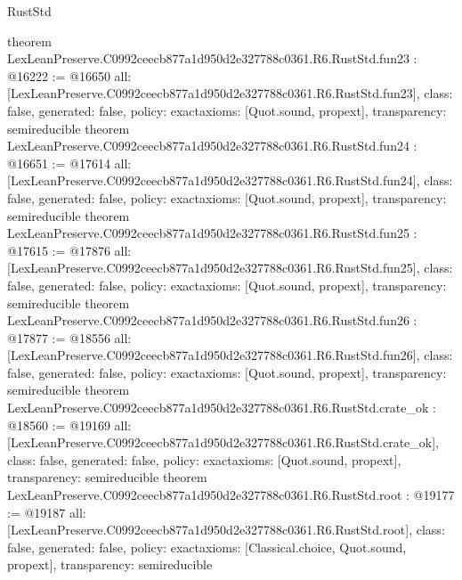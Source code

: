 \begin{lexlean}{RustStd}
\begin{coremodule}
{}
theorem LexLeanPreserve.C0992ceecb877a1d950d2e327788c0361.R6.RustStd.fun23 : @16222 := @16650 {
  all: [LexLeanPreserve.C0992ceecb877a1d950d2e327788c0361.R6.RustStd.fun23],
  class: false,
  generated: false,
  policy: exact{axioms: [Quot.sound, propext]},
  transparency: semireducible
}
theorem LexLeanPreserve.C0992ceecb877a1d950d2e327788c0361.R6.RustStd.fun24 : @16651 := @17614 {
  all: [LexLeanPreserve.C0992ceecb877a1d950d2e327788c0361.R6.RustStd.fun24],
  class: false,
  generated: false,
  policy: exact{axioms: [Quot.sound, propext]},
  transparency: semireducible
}
theorem LexLeanPreserve.C0992ceecb877a1d950d2e327788c0361.R6.RustStd.fun25 : @17615 := @17876 {
  all: [LexLeanPreserve.C0992ceecb877a1d950d2e327788c0361.R6.RustStd.fun25],
  class: false,
  generated: false,
  policy: exact{axioms: [Quot.sound, propext]},
  transparency: semireducible
}
theorem LexLeanPreserve.C0992ceecb877a1d950d2e327788c0361.R6.RustStd.fun26 : @17877 := @18556 {
  all: [LexLeanPreserve.C0992ceecb877a1d950d2e327788c0361.R6.RustStd.fun26],
  class: false,
  generated: false,
  policy: exact{axioms: [Quot.sound, propext]},
  transparency: semireducible
}
theorem LexLeanPreserve.C0992ceecb877a1d950d2e327788c0361.R6.RustStd.crate_ok : @18560 := @19169 {
  all: [LexLeanPreserve.C0992ceecb877a1d950d2e327788c0361.R6.RustStd.crate_ok],
  class: false,
  generated: false,
  policy: exact{axioms: [Quot.sound, propext]},
  transparency: semireducible
}
theorem LexLeanPreserve.C0992ceecb877a1d950d2e327788c0361.R6.RustStd.root : @19177 := @19187 {
  all: [LexLeanPreserve.C0992ceecb877a1d950d2e327788c0361.R6.RustStd.root],
  class: false,
  generated: false,
  policy: exact{axioms: [Classical.choice, Quot.sound, propext]},
  transparency: semireducible
}


\end{coremodule}
\end{lexlean}
